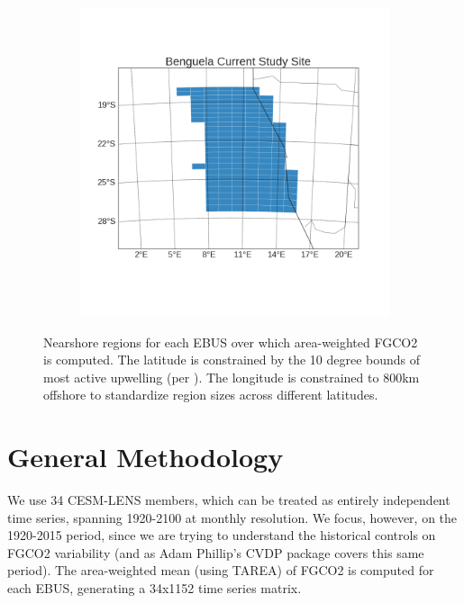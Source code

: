 \documentclass[12pt]{article}
\begin{document}
\begin{figure}[!h]
\begin{subfigure}[b]{0.4\textwidth}
    \end{subfigure}
    \begin{subfigure}[b]{0.4\textwidth}
        \centering
        \includegraphics[width=\linewidth]{../../figs/bencs/study-site/benguela-current-study-site.png}
    \end{subfigure}
    \caption{Nearshore regions for each EBUS over which area-weighted FGCO2 is computed. The latitude is constrained by the 10 degree bounds of most active upwelling (per \citet{Chavez2009}). The longitude is constrained to 800km offshore to standardize region sizes across different latitudes.}
    \label{model:setup}
\end{figure}

\section{General Methodology}
We use 34 CESM-LENS members, which can be treated as entirely independent time series, spanning 1920-2100 at monthly resolution. We focus, however, on the 1920-2015 period, since we are trying to understand the historical controls on FGCO2 variability (and as Adam Phillip's CVDP package covers this same period). The area-weighted mean (using TAREA) of FGCO2 is computed for each EBUS, generating a 34x1152 time series matrix. \\
\end{document}
